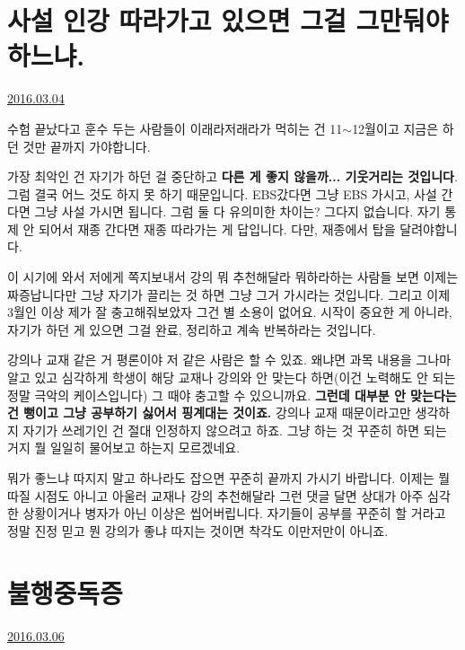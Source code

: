 \section{사설 인강 따라가고 있으면 그걸 그만둬야하느냐.}
\href{https://www.kockoc.com/Apoc/663118}{2016.03.04}

\vspace{5mm}

수험 끝났다고 훈수 두는 사람들이 이래라저래라가 먹히는 건 11$\sim$12월이고
지금은 하던 것만 끝까지 가야합니다.
\vspace{5mm}

가장 최악인 건 자기가 하던 걸 중단하고 \textbf{다른 게 좋지 않을까... 기웃거리는 것입니다}. 그럼 결국 어느 것도 하지 못 하기 때문입니다.
EBS갔다면 그냥 EBS 가시고, 사설 간다면 그냥 사설 가시면 됩니다. 그럼 둘 다 유의미한 차이는? 그다지 없습니다.
자기 통제 안 되어서 재종 간다면 재종 따라가는 게 답입니다. 다만, 재종에서 탑을 달려야합니다.
\vspace{5mm}

이 시기에 와서 저에게 쪽지보내서 강의 뭐 추천해달라 뭐하라하는 사람들 보면 이제는 짜증납니다만
그냥 자기가 끌리는 것 하면 그냥 그거 가시라는 것입니다. 그리고 이제 3월인 이상 제가 잘 충고해줘보았자 그건 별 소용이 없어요.
시작이 중요한 게 아니라, 자기가 하던 게 있으면 그걸 완료, 정리하고 계속 반복하라는 것입니다.
\vspace{5mm}

강의나 교재 같은 거 평론이야 저 같은 사람은 할 수 있죠. 왜냐면 과목 내용을 그나마 알고 있고
심각하게 학생이 해당 교재나 강의와 안 맞는다 하면(이건 노력해도 안 되는 정말 극악의 케이스입니다) 그 때야 충고할 수 있으니까요.
\textbf{그런데 대부분 안 맞는다는 건 뻥이고 그냥 공부하기 싫어서 핑계대는 것이죠.}
강의나 교재 때문이라고만 생각하지 자기가 쓰레기인 건 절대 인정하지 않으려고 하죠.
그냥 하는 것 꾸준히 하면 되는 거지 뭘 일일히 물어보고 하는지 모르겠네요.
\vspace{5mm}

뭐가 좋느냐 따지지 말고 하나라도 잡으면 꾸준히 끝까지 가시기 바랍니다.
이제는 뭘 따질 시점도 아니고 아울러 교재나 강의 추천해달라 그런 댓글 달면 상대가 아주 심각한 상황이거나 병자가 아닌 이상은 씹어버립니다.
자기들이 공부를 꾸준히 할 거라고 정말 진정 믿고 뭔 강의가 좋냐 따지는 것이면 착각도 이만저만이 아니죠.
\vspace{5mm}





\section{불행중독증}
\href{https://www.kockoc.com/Apoc/665182}{2016.03.06}

